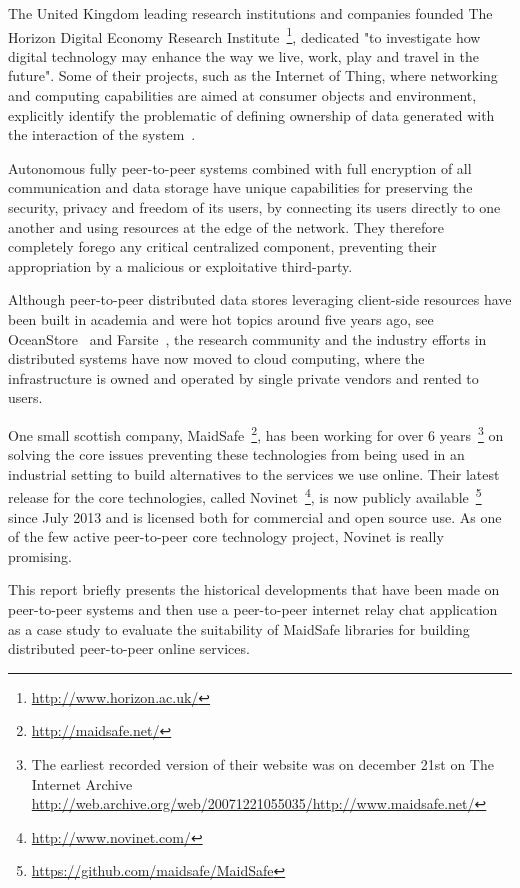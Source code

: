 The United Kingdom leading research institutions and companies founded The Horizon Digital Economy Research Institute~\footnote{\url{http://www.horizon.ac.uk/}}, dedicated "to investigate how digital technology may enhance the way we live, work, play and travel in the future". Some of their projects, such as the Internet of Thing, where networking and computing capabilities are aimed at consumer objects and environment, explicitly identify the problematic of defining ownership of data generated with the interaction of the system~\cite{HorizonIoTChallenges:2013}.

Autonomous fully peer-to-peer systems combined with full encryption of all communication and data storage have unique capabilities for preserving the security, privacy and freedom of its users, by connecting its users directly to one another and using resources at the edge of the network. They therefore completely forego any critical centralized component, preventing their appropriation by a malicious or exploitative third-party.

Although peer-to-peer distributed data stores leveraging client-side resources have been built in academia and were hot topics around five years ago, see OceanStore~\cite{} and Farsite~\cite{}, the research community and the industry efforts in distributed systems have now moved to cloud computing, where the infrastructure is owned and operated by single private vendors and rented to users.

One small scottish company, MaidSafe~\footnote{\url{http://maidsafe.net/}}, has been working for over 6 years~\footnote{The earliest recorded version of their website was on december 21st on The Internet Archive \url{http://web.archive.org/web/20071221055035/http://www.maidsafe.net/}} on solving the core issues preventing these technologies from being used in an industrial setting to build alternatives to the services we use online. Their latest release for the core technologies, called Novinet~\footnote{\url{http://www.novinet.com/}}, is now publicly available~\footnote{\url{https://github.com/maidsafe/MaidSafe}} since July 2013 and is licensed both for commercial and open source use. As one of the few active peer-to-peer core technology project, Novinet is really promising.

This report briefly presents the historical developments that have been made on peer-to-peer systems and then use a peer-to-peer internet relay chat application as a case study to evaluate the suitability of MaidSafe libraries for building distributed peer-to-peer online services.


